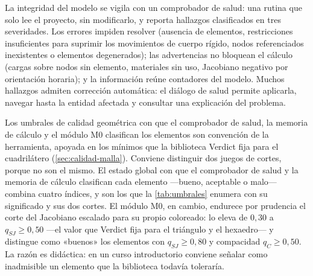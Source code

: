 La integridad del modelo se vigila con un comprobador de salud: una rutina que solo lee el proyecto, sin modificarlo, y reporta hallazgos clasificados en tres severidades. Los errores impiden resolver (ausencia de elementos, restricciones insuficientes para suprimir los movimientos de cuerpo rígido, nodos referenciados inexistentes o elementos degenerados); las advertencias no bloquean el cálculo (cargas sobre nodos sin elemento, materiales sin uso, Jacobiano negativo por orientación horaria); y la información reúne contadores del modelo. Muchos hallazgos admiten corrección automática: el diálogo de salud permite aplicarla, navegar hasta la entidad afectada y consultar una explicación del problema.

Los umbrales de calidad geométrica con que el comprobador de salud, la memoria de cálculo y el módulo M0 clasifican los elementos son convención de la herramienta, apoyada en los mínimos que la biblioteca Verdict fija para el cuadrilátero (\autoref{sec:calidad-malla}). Conviene distinguir dos juegos de cortes, porque no son el mismo. El estado global con que el comprobador de salud y la memoria de cálculo clasifican cada elemento —bueno, aceptable o malo— combina cuatro índices, y son los que la \autoref{tab:umbrales} enumera con su significado y sus dos cortes. El módulo M0, en cambio, endurece por prudencia el corte del Jacobiano escalado para su propio coloreado: lo eleva de $0{,}30$ a $q_{SJ} \ge 0{,}50$ —el valor que Verdict fija para el triángulo y el hexaedro— y distingue como «buenos» los elementos con $q_{SJ} \ge 0{,}80$ y compacidad $q_C \ge 0{,}50$. La razón es didáctica: en un curso introductorio conviene señalar como inadmisible un elemento que la biblioteca todavía toleraría.

